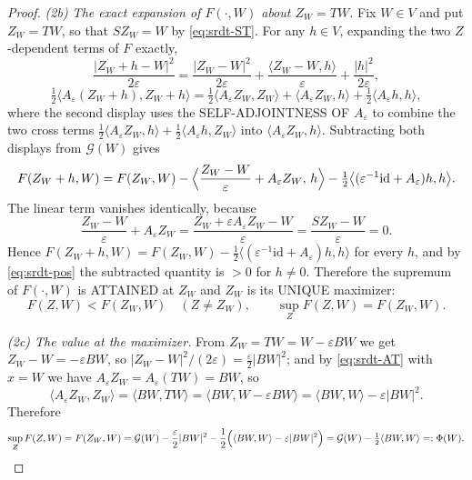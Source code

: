 \begin{proof}
\emph{(2b) The exact expansion of $F(\cdot,W)$ about $Z_W=TW$.}
Fix $W\in V$ and put $Z_W=TW$, so that $S Z_W=W$ by \eqref{eq:srdt-ST}. For any
$h\in V$, expanding the two $Z$-dependent terms of $F$ exactly,
\[
  \frac{|Z_W+h-W|^2}{2\varepsilon}
   =\frac{|Z_W-W|^2}{2\varepsilon}
     +\frac{\langle Z_W-W,h\rangle}{\varepsilon}
     +\frac{|h|^2}{2\varepsilon},
\]
\[
  \tfrac12\bigl\langle A_\varepsilon(Z_W+h),Z_W+h\bigr\rangle
   =\tfrac12\langle A_\varepsilon Z_W,Z_W\rangle
     +\langle A_\varepsilon Z_W,h\rangle
     +\tfrac12\langle A_\varepsilon h,h\rangle,
\]
where the second display uses the SELF-ADJOINTNESS OF $A_\varepsilon$ to
combine the two cross terms
$\tfrac12\langle A_\varepsilon Z_W,h\rangle
+\tfrac12\langle A_\varepsilon h,Z_W\rangle$ into
$\langle A_\varepsilon Z_W,h\rangle$. Subtracting both displays from
$\mathcal G(W)$ gives
\begin{equation}\label{eq:srdt-expand}
  F(Z_W+h,W)=F(Z_W,W)
    -\Bigl\langle\frac{Z_W-W}{\varepsilon}+A_\varepsilon Z_W,\,h\Bigr\rangle
    -\tfrac12\bigl\langle(\varepsilon^{-1}\mathrm{id}
      +A_\varepsilon)h,h\bigr\rangle .
\end{equation}
The linear term vanishes identically, because
\[
  \frac{Z_W-W}{\varepsilon}+A_\varepsilon Z_W
   =\frac{Z_W+\varepsilon A_\varepsilon Z_W-W}{\varepsilon}
   =\frac{S Z_W-W}{\varepsilon}=0 .
\]
Hence $F(Z_W+h,W)=F(Z_W,W)
-\tfrac12\langle(\varepsilon^{-1}\mathrm{id}+A_\varepsilon)h,h\rangle$ for
every $h$, and by \eqref{eq:srdt-pos} the subtracted quantity is $>0$ for
$h\ne0$. Therefore the supremum of $F(\cdot,W)$ is ATTAINED at $Z_W$ and
$Z_W$ is its UNIQUE maximizer:
\begin{equation}\label{eq:srdt-unique}
  F(Z,W)<F(Z_W,W)\quad(Z\ne Z_W),\qquad\sup_ZF(Z,W)=F(Z_W,W).
\end{equation}

\emph{(2c) The value at the maximizer.}
From $Z_W=TW=W-\varepsilon BW$ we get $Z_W-W=-\varepsilon BW$, so
$|Z_W-W|^2/(2\varepsilon)=\tfrac{\varepsilon}{2}|BW|^2$; and by
\eqref{eq:srdt-AT} with $x=W$ we have $A_\varepsilon Z_W=A_\varepsilon(TW)=BW$,
so
\[
  \langle A_\varepsilon Z_W,Z_W\rangle=\langle BW,TW\rangle
   =\langle BW,W-\varepsilon BW\rangle
   =\langle BW,W\rangle-\varepsilon|BW|^2 .
\]
Therefore
\begin{equation}\label{eq:srdt-duality}
  \sup_ZF(Z,W)=F(Z_W,W)
   =\mathcal G(W)-\frac{\varepsilon}{2}|BW|^2
     -\frac12\Bigl(\langle BW,W\rangle-\varepsilon|BW|^2\Bigr)
   =\mathcal G(W)-\tfrac12\langle BW,W\rangle=:\Phi(W).
\end{equation}


\end{proof}
